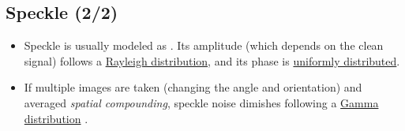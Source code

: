 \subsection{Speckle (2/2)}
\begin{itemize}
\item Speckle is usually modeled as . Its amplitude (which depends on the clean
  signal) follows a
  \href{https://en.wikipedia.org/wiki/Rayleigh_distribution}{Rayleigh
    distribution}, and its phase is
  \href{https://en.wikipedia.org/wiki/Discrete_uniform_distribution}{uniformly
    distributed}.

\item If multiple images are taken (changing the angle and
  orientation) and averaged \emph{spatial compounding}, speckle noise
  dimishes following a
  \href{https://en.wikipedia.org/wiki/Gamma_distribution}{Gamma
    distribution} \cite{bushberg2011essential}.
\end{itemize}